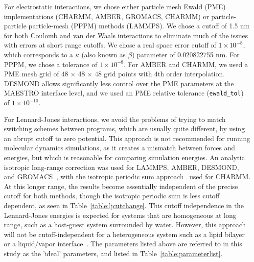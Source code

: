 For electrostatic interactions, we chose either particle mesh Ewald
(PME) implementations (CHARMM, AMBER, GROMACS, CHARMM) or
particle-particle particle-mesh (PPPM) methods (LAMMPS). We chose a
cutoff of 1.5 nm for both Coulomb and van der Waals interactions to
eliminate much of the issues with errors at short range cutoffs. We
chose a real space error cutoff of $1\times 10^{-8}$, which corresponds
to a $\kappa$ (also known as $\beta$) parameter of 0.020822755 nm.  For PPPM, we
chose a tolerance of $1\times10^{-8}$. 
For AMBER and
CHARMM, we used a PME mesh grid of 48 $\times$ 48 $\times$ 48 grid
points with 4th order interpolation. DESMOND allows significantly less
control over the PME parameters at the MAESTRO interface level, and we
used an PME relative tolerance ({\tt ewald\_tol}) of $1\times 10^{-10}$. 

For Lennard-Jones interactions, we avoid the problems of trying to
match switching schemes between programs, which are usually quite
different, by using an abrupt cutoff to zero potential. This approach
is not recommended for running molecular dynamics simulations, as it
creates a mismatch between forces and energies, but which is
reasonable for comparing simulation energies. An analytic isotropic
long-range correction was used for LAMMPS, AMBER, DESMOND, and
GROMACS~\citep{AllenAndTildesley,shirts_accurate_2007}, with the
isotropic periodic sum approach~\citep{wu_isotropic_2005} used for
CHARMM.  At this longer range, the results become essentially
independent of the precise cutoff for both methods, though the
isotropic periodic sum is less cutoff dependent, as seen in
Table~\ref{table:ljcutchange}. This cutoff independence in the
Lennard-Jones energies is expected for systems that are homogeneous at
long range, such as a host-guest system surrounded by water.  However,
this approach will not be cutoff-independent for a heterogeneous
system such as a lipid bilayer or a liquid/vapor
interface~\cite{veld_application_2007}. The parameters listed above
are referred to in this study as the 'ideal' parameters, and listed in
Table~\ref{table:parameterlist}.

